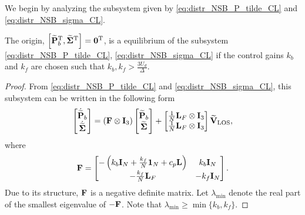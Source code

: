 We begin by analyzing the subsystem given by \eqref{eq:distr_NSB_P_tilde_CL} and \eqref{eq:distr_NSB_sigma_CL}.
\begin{lemma}
    \label{lemma1}
    The origin, $\left[\widetilde{\mathbf{P}}_b^{\mathrm{T}}, \widetilde{\bm{\Sigma}}^{\mathrm{T}}\right] = \mathbf{0}^{\mathrm{T}}$, is a  equilibrium of the subsystem \eqref{eq:distr_NSB_P_tilde_CL}, \eqref{eq:distr_NSB_sigma_CL} if the control gains $k_b$ and $k_f$ are chosen such that $k_b, k_f > \frac{3U_d}{\Delta}$.
\end{lemma}
\begin{proof}        
    From \eqref{eq:distr_NSB_P_tilde_CL} and \eqref{eq:distr_NSB_sigma_CL}, this subsystem can be written in the following form
    \begin{equation}
        \begin{bmatrix}
            \dot{\widetilde{\mathbf{P}}}_{b} \\ \dot{\widetilde{\bm{\Sigma}}}
        \end{bmatrix}
        =
        \left( \mathbf{F} \otimes \mathbf{I}_3 \right)
        \begin{bmatrix}
            {\widetilde{\mathbf{P}}}_{b} \\ {\widetilde{\bm{\Sigma}}}
        \end{bmatrix}
        +
        \begin{bmatrix}
            \frac{1}{N} \mathbf{L}_{F} \otimes \mathbf{I}_3 \\ \frac{1}{N} \mathbf{L}_{F} \otimes \mathbf{I}_3
        \end{bmatrix}
        \widetilde{\mathbf{V}}_{\rm LOS},
        \label{eq:distr_NSB_P_Sigma_subsystem}
    \end{equation}
    where
    \begin{equation}
        \mathbf{F} 
        =             
        \begin{bmatrix}
            -\left(k_b\mathbf{I}_N + \frac{k_f}{N}\mathbf{1}_N + c_p\mathbf{L}\right) & k_b\mathbf{I}_N \\
            -\frac{k_f}{N} \mathbf{L}_{F} & -k_f \mathbf{I}_N
        \end{bmatrix}.
    \end{equation}
    Due to its structure, $\mathbf{F}$ is a negative definite matrix.
    Let $\lambda_{\min}$ denote the real part of the smallest eigenvalue of $-\mathbf{F}$.
    Note that $\lambda_{\min} \geq \min\{k_b, k_f\}$.


\end{proof}
